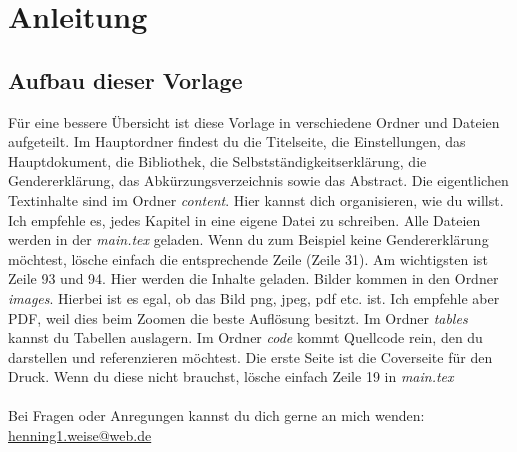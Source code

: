 \newpage
\section{Anleitung}

\subsection{Aufbau dieser Vorlage}
    Für eine bessere Übersicht ist diese Vorlage in verschiedene Ordner und Dateien aufgeteilt. Im Hauptordner findest du die Titelseite, die Einstellungen, das Hauptdokument, die Bibliothek, die Selbstständigkeitserklärung, die Gendererklärung, das Abkürzungsverzeichnis sowie das Abstract. Die eigentlichen Textinhalte sind im Ordner \textit{content}. Hier kannst dich organisieren, wie du willst. Ich empfehle es, jedes Kapitel in eine eigene Datei zu schreiben. Alle Dateien werden in der \textit{main.tex} geladen. Wenn du zum Beispiel keine Gendererklärung möchtest, lösche einfach die entsprechende Zeile (Zeile 31). Am wichtigsten ist Zeile 93 und 94. Hier werden die Inhalte geladen. Bilder kommen in den Ordner \textit{images}. Hierbei ist es egal, ob das Bild png, jpeg, pdf etc. ist. Ich empfehle aber PDF, weil dies beim Zoomen die beste Auflösung besitzt. Im Ordner \textit{tables} kannst du Tabellen auslagern. Im Ordner \textit{code} kommt Quellcode rein, den du darstellen und referenzieren möchtest. Die erste Seite ist die Coverseite für den Druck. Wenn du diese nicht brauchst, lösche einfach Zeile 19 in \textit{main.tex}\\\\
    Bei Fragen oder Anregungen kannst du dich gerne an mich wenden: 
    \href{mailto:henning1.weise@web.de}{henning1.weise@web.de}

